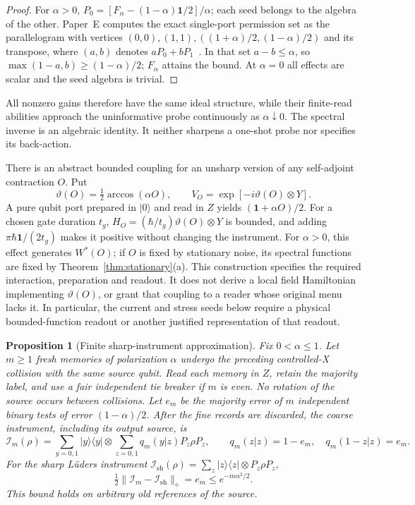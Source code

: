 \documentclass[12pt]{article}
\newtheorem{proposition}[theorem]{Proposition}
\theoremstyle{definition}
\theoremstyle{remark}
\begin{document}
\begin{proof}
For \(\alpha>0\),
\(P_0=[F_\alpha-(1-\alpha)\mathbf1/2]/\alpha\); each seed belongs to the
algebra of the other. Paper~E computes the exact single-port permission set
as the parallelogram with vertices
\((0,0),(1,1),((1+\alpha)/2,(1-\alpha)/2)\) and its transpose,
where \((a,b)\) denotes \(aP_0+bP_1\)~\cite{HAFFE}.
In that set \(a-b\le\alpha\), so
\(\max(1-a,b)\ge(1-\alpha)/2\); \(F_\alpha\) attains the bound.
At \(\alpha=0\) all effects are scalar and the seed algebra is trivial.
\end{proof}

All nonzero gains therefore have the same ideal structure, while their
finite-read abilities approach the uninformative probe continuously as
\(\alpha\downarrow0\). The spectral inverse is an algebraic identity.
It neither sharpens a one-shot probe nor specifies its back-action.

There is an abstract bounded coupling for an unsharp version of any
self-adjoint contraction \(O\). Put
\[
\vartheta(O)=\tfrac12\arccos(\alpha O),\qquad
V_O=\exp[-i\vartheta(O)\otimes Y].
\]
A pure qubit port prepared in \(|0\rangle\) and read in \(Z\) yields
\((\mathbf1+\alpha O)/2\). For a chosen gate duration \(t_g\),
\(H_O=(\hbar/t_g)\vartheta(O)\otimes Y\) is bounded, and adding
\(\pi\hbar\mathbf1/(2t_g)\) makes it positive without changing the instrument.
For \(\alpha>0\), this effect generates \(W^*(O)\); if \(O\) is fixed by
stationary noise, its spectral functions are fixed by
Theorem~\ref{thm:stationary}(a). This construction specifies the required
interaction, preparation and readout. It does not derive a local field
Hamiltonian implementing \(\vartheta(O)\), or grant that coupling to a
reader whose original menu lacks it. In particular, the current and stress
seeds below require a physical bounded-function readout or another justified
representation of that readout.

\begin{proposition}[Finite sharp-instrument approximation]\label{prop:readbridge}
Fix \(0<\alpha\le1\). Let \(m\ge1\) fresh memories of polarization \(\alpha\)
undergo the preceding controlled-X collision with the \emph{same} source
qubit. Read each memory in \(Z\), retain the majority label, and use a fair
independent tie breaker if \(m\) is even. No rotation of the source occurs
between collisions. Let \(e_m\) be the majority error of \(m\) independent
binary tests of error \((1-\alpha)/2\). After the fine records are discarded,
the coarse instrument, including its output source, is
\[
\mathcal I_m(\rho)=
\sum_{y=0,1}|y\rangle\langle y|\otimes
 \sum_{z=0,1}q_m(y|z)P_z\rho P_z,\qquad
q_m(z|z)=1-e_m,\quad q_m(1-z|z)=e_m .
\]
For the sharp L\"uders instrument
\(\mathcal I_{\mathrm{sh}}(\rho)=\sum_z|z\rangle\langle z|\otimes P_z\rho P_z\),
\[
\tfrac12\|\mathcal I_m-\mathcal I_{\mathrm{sh}}\|_\diamond=e_m
\le e^{-m\alpha^2/2}.
\]
This bound holds on arbitrary old references of the source.
\end{proposition}
\end{document}
